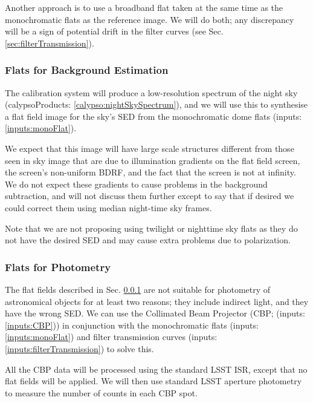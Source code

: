 \documentclass[12pt]{article}
\newcommand{\inputData}[1]{(inputs: \ref{inputs:#1})}
\newcommand{\calypsoData}[1]{(calypsoProducts: \ref{calypso:#1})}
\newcommand{\secRef}[1]{Sec. \ref{sec:#1}}
\begin{document}
Another approach is to use a broadband flat taken at the same time as the monochromatic flats
as the reference image.  We will do both;  any discrepancy will be a sign of potential
drift in the filter curves (see \secRef{filterTransmission}).

\subsubsection{Flats for Background Estimation}
\label{sec:backgroundFlats}

The calibration system will produce a low-resolution spectrum of the night sky \calypsoData{nightSkySpectrum},
and we will use this to synthesise a flat field image for the sky's SED from the monochromatic dome flats
\inputData{monoFlat}.

We expect that this image will have large scale structures different from those seen in sky image
that are due to illumination gradients on the flat field screen, the screen's non-uniform BDRF, and
the fact that the screen is not at infinity.  We do not expect these gradients to cause problems in
the background subtraction, and will not discuss them further except to say that if desired we could
correct them using median night-time sky frames.

Note that we are not proposing using twilight or nighttime sky flats as they do not have the desired
SED and may cause extra problems due to polarization.

\subsubsection{Flats for Photometry}
\label{sec:photometricFlats}

The flat fields described in \secRef{backgroundFlats} are not suitable for photometry of astronomical
objects for at least two reasons;  they include indirect light, and they have the wrong SED.  We can
use the Collimated Beam Projector (CBP; \inputData{CBP}) in conjunction with the monochromatic flats
\inputData{monoFlat} and filter transmission curves \inputData{filterTransmission} to solve this.

All the CBP data will be processed using the standard LSST ISR, except that no flat fields will be applied.
We will then use standard LSST aperture photometry to measure the number of counts in each CBP spot.
\end{document}
